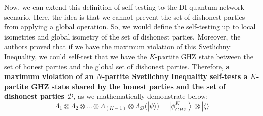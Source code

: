 \documentclass[12pt]{article}
\begin{document}
    \noindent Now, we can extend this definition of self-testing to the DI quantum network scenario. Here, the idea is that we cannot prevent the set of dishonest parties from applying a global operation. So, we would define the self-testing up to local isometries and global isometry of the set of dishonest parties. Moreover, the authors proved that if we have the maximum violation of this Svetlichny Inequality, we could self-test that we have the $K$-partite GHZ state between the set of honest parties and the global set of dishonest parties. Therefore, \textbf{a maximum violation of an $N$-partite Svetlichny Inequality \color{Red} self-tests a $K$-partite GHZ state \color{Black} shared by the honest parties and the set of dishonest parties $\mathcal{D}$}, as we mathematically demonstrate below:
    $$ {\Lambda}_{1} \otimes {\Lambda}_{2} \otimes \dots \otimes {\Lambda}_{(K - 1)} \otimes {\Lambda}_{\mathcal{D}} (|\psi\rangle) = \left| {\phi}_{GHZ}^{K} \right\rangle \otimes |\zeta\rangle $$

    \clearpage
    
\end{document}
